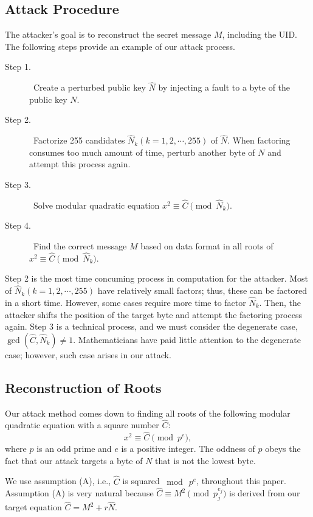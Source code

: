 \documentclass{article}
\begin{document}
\subsection{Attack Procedure}\label{AP}
The attacker's goal is to reconstruct the secret message $M$, including the UID.
The following steps provide an example of our attack process. 
\begin{description}
\item[Step 1.] ~Create a perturbed public key $\hat{N}$ 
by injecting a fault to a byte of the public key $N$.
\item[Step 2.] ~Factorize 255 candidates $\hat{N}_k(k=1,2,\cdots, 255)$ of $\hat{N}$. 
When factoring consumes too much amount of time, perturb another byte of $N$ and attempt this process again.
\item[Step 3.] ~Solve modular quadratic equation $x^2\equiv \hat{C}\pmod{\hat{N}_k}$.
\item[Step 4.] ~Find the correct message $M$ based on data format in all roots of $x^2\equiv \hat{C}\pmod{\hat{N}_k}$.
\end{description}
Step 2 is the most time concuming process in computation for the attacker. 
Most of $\hat{N}_k(k=1,2,\cdots, 255)$ have relatively small factors; thus, these 
can be factored in a short time.
However, some cases require more time to factor $\hat{N}_k$. Then, the attacker 
shifts the position of the target byte and attempt the factoring process again. 
Step 3 is a technical process, and we must consider the degenerate case, 
$\gcd(\hat{C},\hat{N}_k)\ne 1$.
Mathematicians have paid little attention to the degenerate case; however, 
such case arises in our attack. 

\subsection{Reconstruction of Roots}\label{roots}
Our attack method comes down to finding all roots of the following 
modular quadratic equation with a square number $\hat{C}$:
\begin{equation}\label{QE}
x^2 \equiv \hat{C}\pmod{p^e},
\end{equation}
where $p$ is an odd prime and $e$ is a positive integer. 
The oddness of $p$ obeys the fact that our attack targets a byte of $N$ that is not the lowest byte.

We use assumption (A), i.e., $\hat{C}$ is squared $\bmod{~p^e}$, throughout this paper. 
Assumption (A) is very natural because $\hat{C}\equiv M^2\pmod{p_j^{e_j}}$ is derived from 
our target equation $\hat{C} = M^2 + r\hat{N}$. 
\end{document}
